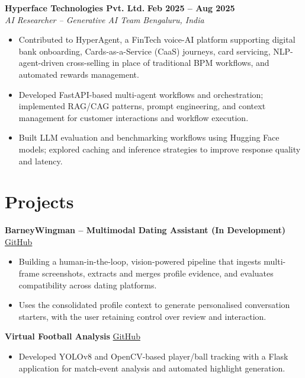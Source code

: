 \documentclass[10pt,a4paper]{extarticle}
\newcommand{\experience}[4]{%
  \textbf{#1} \hfill \textbf{#2}\\[-1pt]
  \textit{#3} \hfill \textit{#4}\\[-4pt]
}
\begin{document}
\vspace{3pt}

\experience
{Hyperface Technologies Pvt. Ltd.}
{Feb 2025 -- Aug 2025}
{AI Researcher -- Generative AI Team}
{Bengaluru, India}

\begin{itemize}
  \item Contributed to HyperAgent, a FinTech voice-AI platform supporting digital bank onboarding, Cards-as-a-Service (CaaS) journeys, card servicing, NLP-agent-driven cross-selling in place of traditional BPM workflows, and automated rewards management.

  \item Developed FastAPI-based multi-agent workflows and orchestration; implemented RAG/CAG patterns, prompt engineering, and context management for customer interactions and workflow execution.

  \item Built LLM evaluation and benchmarking workflows using Hugging Face models; explored caching and inference strategies to improve response quality and latency.
\end{itemize}

\section{Projects}

\textbf{BarneyWingman -- Multimodal Dating Assistant (In Development)}
\hfill \href{https://github.com/driizzyybreezzyy/barney-digital-wingman}{GitHub}\\[-2pt]
\begin{itemize}
  \item Building a human-in-the-loop, vision-powered pipeline that ingests multi-frame screenshots, extracts and merges profile evidence, and evaluates compatibility across dating platforms.
  \item Uses the consolidated profile context to generate personalised conversation starters, with the user retaining control over review and interaction.
\end{itemize}

\vspace{1pt}

\textbf{Virtual Football Analysis}
\hfill \href{https://github.com/driizzyybreezzyy/Football-Analysis}{GitHub}\\[-2pt]
\begin{itemize}
  \item Developed YOLOv8 and OpenCV-based player/ball tracking with a Flask application for match-event analysis and automated highlight generation.
\end{itemize}
\end{document}
